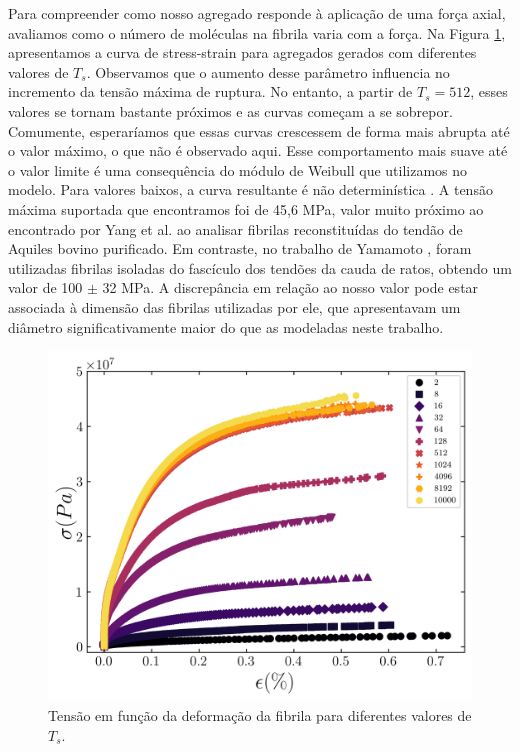 \documentclass{article}
\begin{document}
    \indent Para compreender como nosso agregado responde à aplicação de uma força axial, avaliamos como o número de 
    moléculas na fibrila varia com a força. Na Figura \ref{R5}, apresentamos a curva de stress-strain para agregados 
    gerados com diferentes valores de \(T_{s}\). Observamos que o aumento desse parâmetro influencia no incremento da 
    tensão máxima de ruptura. No entanto, a partir de \(T_{s} = 512\), esses valores se tornam bastante próximos e as 
    curvas começam a se sobrepor. Comumente, esperaríamos que essas curvas crescessem de forma mais abrupta até o valor
    máximo, o que não é observado aqui. Esse comportamento mais suave até o valor limite é uma consequência do módulo 
    de Weibull que utilizamos no modelo. Para valores baixos, a curva resultante é não determinística 
    \cite{Parkinson1997}. A tensão máxima suportada que encontramos foi de 45,6 MPa, valor muito próximo ao encontrado 
    por Yang et al. \cite{YANG2012148} ao analisar fibrilas reconstituídas do tendão de Aquiles bovino purificado. 
    Em contraste, no trabalho de Yamamoto \cite{Noritaka}, foram utilizadas fibrilas isoladas do fascículo dos tendões 
    da cauda de ratos, obtendo um valor de 100 \(\pm\) 32 MPa. A discrepância em relação ao nosso valor pode estar 
    associada à dimensão das fibrilas utilizadas por ele, que apresentavam um diâmetro significativamente maior do que 
    as modeladas neste trabalho.

    \begin{figure}[H]
        \centering
        \includegraphics[width=\textwidth]{figures/stress_strain.png}

        \caption{Tensão em função da deformação da fibrila para diferentes valores de \(T_{s}\).} 

        \label{R5}
    \end{figure}
\end{document}
